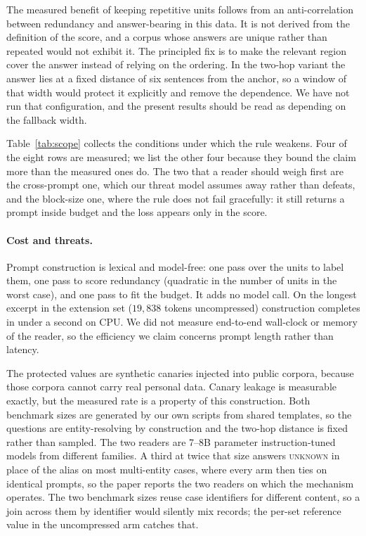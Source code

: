 The measured benefit of keeping repetitive units follows from an anti-correlation between
redundancy and answer-bearing in this data. It is not derived from the definition of the
score, and a corpus whose answers are unique rather than repeated would not exhibit it. The
principled fix is to make the relevant region cover the answer instead of relying on the
ordering. In the two-hop variant the answer lies at a fixed distance of six sentences from
the anchor, so a window of that width would protect it explicitly and remove the dependence.
We have not run that configuration, and the present results should be read as depending on
the fallback width.

Table~\ref{tab:scope} collects the conditions under which the rule weakens. Four of the eight
rows are measured; we list the other four because they bound the claim more than the measured
ones do. The two that a reader should weigh first are the cross-prompt one, which our threat
model assumes away rather than defeats, and the block-size one, where the rule does not fail
gracefully: it still returns a prompt inside budget and the loss appears only in the score.

\paragraph{Cost and threats.}
Prompt construction is lexical and model-free: one pass over the units to label them, one
pass to score redundancy (quadratic in the number of units in the worst case), and one pass
to fit the budget. It adds no model call. On the longest excerpt in the extension set
($19{,}838$ tokens uncompressed) construction completes in under a second on CPU. We did not
measure end-to-end wall-clock or memory of the reader, so the efficiency we claim concerns
prompt length rather than latency.

The protected values are synthetic canaries injected into public corpora, because those
corpora cannot carry real personal data. Canary leakage is measurable exactly, but the
measured rate is a property of this construction. Both benchmark sizes are generated by our
own scripts from shared templates, so the questions are entity-resolving by construction and
the two-hop distance is fixed rather than sampled. The two readers are 7--8B parameter
instruction-tuned models from different families. A third at twice that size answers
\textsc{unknown} in place of the alias on most multi-entity cases, where every arm then ties on
identical prompts, so the paper reports the two readers on which the mechanism operates. The two
benchmark sizes reuse case identifiers for different content, so a join across them by identifier
would silently mix records; the per-set reference value in the uncompressed arm catches that.
